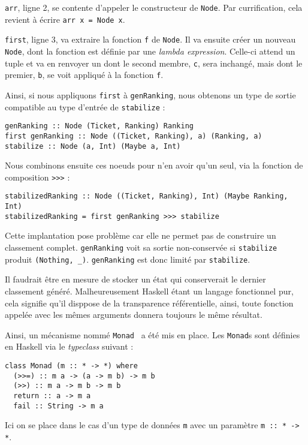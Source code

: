 \documentclass{llncs}
\begin{document}
\lstinline{arr}, ligne 2, se contente d'appeler le constructeur de \lstinline{Node}.
Par currification, cela revient à écrire \lstinline{arr x = Node x}.

\lstinline{first}, ligne 3, va extraire la fonction \lstinline{f} de \lstinline{Node}.
Il va ensuite créer un nouveau \lstinline{Node}, dont la fonction est définie par
une \emph{lambda expression}.
Celle-ci attend un tuple et va en renvoyer un dont le second membre, \lstinline{c},
sera inchangé, mais dont le premier, \lstinline{b}, se voit appliqué à la fonction \lstinline{f}.

Ainsi, si nous appliquons \lstinline{first} à \lstinline{genRanking}, nous obtenons
un type de sortie compatible au type d'entrée de \lstinline{stabilize} :
\begin{lstlisting}
genRanking :: Node (Ticket, Ranking) Ranking
first genRanking :: Node ((Ticket, Ranking), a) (Ranking, a)
stabilize :: Node (a, Int) (Maybe a, Int)
\end{lstlisting}

Nous combinons ensuite ces noeuds pour n'en avoir qu'un seul, via la fonction
de composition \lstinline{>>>} :
\begin{lstlisting}
stabilizedRanking :: Node ((Ticket, Ranking), Int) (Maybe Ranking, Int)
stabilizedRanking = first genRanking >>> stabilize
\end{lstlisting}

Cette implantation pose problème car elle ne permet pas de construire un classement
complet. \lstinline{genRanking} voit sa sortie non-conservée si \lstinline{stabilize}
produit \lstinline{(Nothing, _)}.
\lstinline{genRanking} est donc limité par \lstinline{stabilize}.

Il faudrait être en mesure de stocker un état qui conserverait le dernier classement
généré.
Malheureusement Haskell étant un langage fonctionnel pur, cela signifie qu'il disppose
de la transparence référentielle, ainsi, toute fonction appelée avec les mêmes arguments
donnera toujours le même résultat.

Ainsi, un mécanisme nommé \lstinline{Monad}~\cite{Wadler90} a été mis en place.
Les \lstinline{Monad}s sont définies en Haskell via le \emph{typeclass} suivant :
\begin{lstlisting}
class Monad (m :: * -> *) where
  (>>=) :: m a -> (a -> m b) -> m b
  (>>) :: m a -> m b -> m b
  return :: a -> m a
  fail :: String -> m a
\end{lstlisting}

Ici on se place dans le cas d'un type de données \lstinline{m} avec un paramètre
\lstinline{m :: * -> *}.
\end{document}
